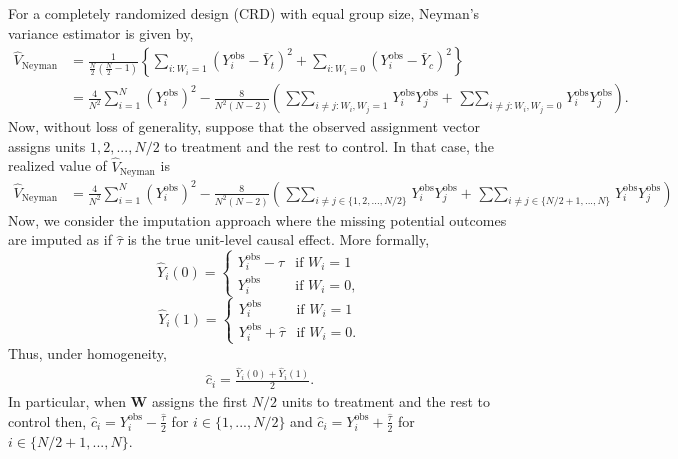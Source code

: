\documentclass[12pt]{article}
\begin{document}
For a completely randomized design (CRD) with equal group size, Neyman's variance estimator is given by,
\begin{align}
    \hat{V}_{\text{Neyman}} & = \frac{1}{\frac{N}{2}(\frac{N}{2}-1)}\left\{\sum_{i:W_i = 1}(Y^{\text{obs}}_i - \bar{Y}_t)^2+ \sum_{i:W_i = 0}(Y^{\text{obs}}_i - \bar{Y}_c)^2 \right\} \nonumber\\
    & = \frac{4}{N^2}\sum_{i=1}^{N}(Y^{\text{obs}}_i)^2 - \frac{8}{N^2(N-2)}\left(\mathop{\sum\sum}_{i \neq j: W_i,W_j = 1}Y^{\text{obs}}_i Y^{\text{obs}}_j + \mathop{\sum\sum}_{i \neq j: W_i,W_j = 0}Y^{\text{obs}}_i Y^{\text{obs}}_j \right). \label{eq_A_impute_neyman}
\end{align}
Now, without loss of generality, suppose that the observed assignment vector assigns units $1,2,...,N/2$ to treatment and the rest to control. In that case, the realized value of $\hat{V}_{\text{Neyman}}$ is
\begin{align}
 \hat{V}_{\text{Neyman}} & =  \frac{4}{N^2}\sum_{i=1}^{N}(Y^{\text{obs}}_i)^2 - \frac{8}{N^2(N-2)}\left(\mathop{\sum\sum}_{i \neq j \in \{1,2,...,N/2\}}Y^{\text{obs}}_i Y^{\text{obs}}_j + \mathop{\sum\sum}_{i \neq j \in \{N/2+1,...,N\}}Y^{\text{obs}}_i Y^{\text{obs}}_j \right)   
\end{align}
Now, we consider the imputation approach where the missing potential outcomes are imputed as if $\hat{\tau}$ is the true unit-level causal effect. More formally, 
\begin{equation}
  \hat{Y}_i(0) = 
    \begin{cases}
     Y^{\text{obs}}_i - \hat{\tau} & \text{if $W_i = 1$}\\
    Y^{\text{obs}}_i & \text{if $W_i = 0$},
    \end{cases}       
\end{equation}
\begin{equation}
  \hat{Y}_i(1) =
    \begin{cases}
     Y^{\text{obs}}_i & \text{if $W_i = 1$}\\
    Y^{\text{obs}}_i + \hat{\tau} & \text{if $W_i = 0$}.
    \end{cases}       
\end{equation}
Thus, under homogeneity, 
\begin{align}
    \hat{c}_i = \frac{\hat{Y}_i(0) + \hat{Y}_i(1)}{2}.
\end{align}
In particular, when $\bm{W}$ assigns the first $N/2$ units to treatment and the rest to control then, $\hat{c}_i = Y^{\text{obs}}_i - \frac{\hat{\tau}}{2}$ for $i \in \{1,...,N/2\}$ and $\hat{c}_i = Y^{\text{obs}}_i + \frac{\hat{\tau}}{2}$ for $i \in \{N/2+1,...,N\}$. 
\end{document}
